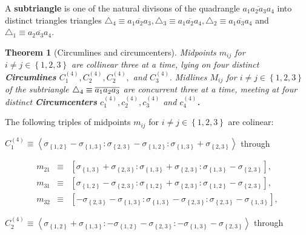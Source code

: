 \documentclass[11pt]{article}
\newtheorem{theorem}{Theorem}
\begin{document}
A \textbf{subtriangle} is one of the natural divisons of the quadrangle $%
\overline{a_{1}a_{2}a_{3}a_{4}}$ into distinct triangles triangles $%
\triangle _{4}\equiv \overline{a_{1}a_{2}a_{3}},\triangle _{3}\equiv 
\overline{a_{1}a_{2}a_{4}},\triangle _{2}\equiv \overline{a_{1}a_{3}a_{4}}$
and $\triangle _{1}\equiv \overline{a_{2}a_{3}a_{4}}$.

\begin{theorem}[Circumlines and circumcenters]
Midpoints $m_{ij}$ for $i\neq j\in \left\{ 1,2,3\right\} $ are collinear
three at a time, lying on four distinct \textbf{Circumlines} $C_{1}^{\left(
4\right) },C_{2}^{\left( 4\right) },C_{2}^{\left( 4\right) },$ and $%
C_{3}^{\left( 4\right) }.$ Midlines $M_{ij}$ for $i\neq j\in \left\{
1,2,3\right\} $ of the subtriangle $\triangle _{4}\equiv \overline{%
a_{1}a_{2}a_{3}}$ are concurrent three at a time, meeting at four distinct 
\textbf{Circumcenters} $c_{1}^{\left( 4\right) },c_{2}^{\left( 4\right)
},c_{3}^{\left( 4\right) }$ and $c_{4}^{\left( 4\right) }$\textbf{.}
\end{theorem}

The following triples of midpoints $m_{ij}$ for $i\neq j\in \left\{
1,2,3\right\} $ are colinear:

$C_{1}^{\left( 4\right) }\equiv \left\langle \sigma _{\left\{ 1,2\right\}
}-\sigma _{\left\{ 1,3\right\} }:\sigma _{\left\{ 2,3\right\} }-\sigma
_{\left\{ 1,2\right\} }:\sigma _{\left\{ 1,3\right\} }+\sigma _{\left\{
2,3\right\} }\right\rangle $ through

\begin{eqnarray*}
m_{21} &\equiv &\left[ \sigma _{\left\{ 1,3\right\} }+\sigma _{\left\{
2,3\right\} }:\sigma _{\left\{ 1,3\right\} }+\sigma _{\left\{ 2,3\right\}
}:\sigma _{\left\{ 1,3\right\} }-\sigma _{\left\{ 2,3\right\} }\right] , \\
m_{31} &\equiv &\left[ \sigma _{\left\{ 1,2\right\} }-\sigma _{\left\{
2,3\right\} }:\sigma _{\left\{ 1,2\right\} }+\sigma _{\left\{ 2,3\right\}
}:\sigma _{\left\{ 1,2\right\} }-\sigma _{\left\{ 2,3\right\} }\right] , \\
m_{32} &\equiv &\left[ -\sigma _{\left\{ 2,3\right\} }-\sigma _{\left\{
1,3\right\} }:\sigma _{\left\{ 1,3\right\} }-\sigma _{\left\{ 2,3\right\}
}:\sigma _{\left\{ 2,3\right\} }-\sigma _{\left\{ 1,3\right\} }\right] ,
\end{eqnarray*}

$C_{2}^{\left( 4\right) }\equiv \left\langle \sigma _{\left\{ 1,2\right\}
}+\sigma _{\left\{ 1,3\right\} }:-\sigma _{\left\{ 1,2\right\} }-\sigma
_{\left\{ 2,3\right\} }:-\sigma _{\left\{ 1,3\right\} }-\sigma _{\left\{
2,3\right\} }\right\rangle $ through
\end{document}
